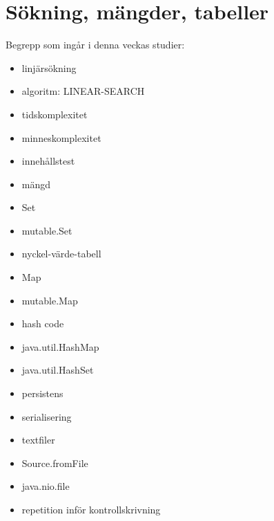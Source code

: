 \chapter{Sökning, mängder, tabeller}\label{chapter:W07}
Begrepp som ingår i denna veckas studier:
\begin{itemize}[noitemsep,label={$\square$},leftmargin=*]
\item linjärsökning
\item algoritm: LINEAR-SEARCH
\item tidskomplexitet
\item minneskomplexitet
\item innehållstest
\item mängd
\item Set
\item mutable.Set
\item nyckel-värde-tabell
\item Map
\item mutable.Map
\item hash code
\item java.util.HashMap
\item java.util.HashSet
\item persistens
\item serialisering
\item textfiler
\item Source.fromFile
\item java.nio.file
\item repetition inför kontrollskrivning\end{itemize}
